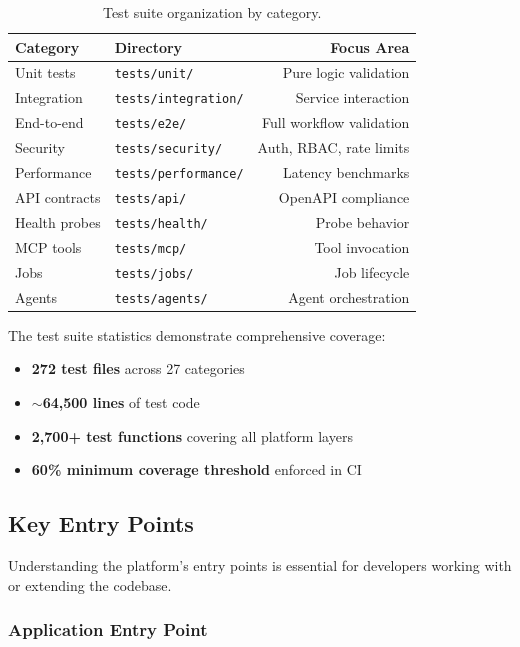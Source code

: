 \begin{table}[ht]
\centering
\caption{Test suite organization by category.}
\label{tab:test-categories}
\small
\begin{tabular}{llr}
\hline
\textbf{Category} & \textbf{Directory} & \textbf{Focus Area} \\
\hline
Unit tests & \texttt{tests/unit/} & Pure logic validation \\
Integration & \texttt{tests/integration/} & Service interaction \\
End-to-end & \texttt{tests/e2e/} & Full workflow validation \\
Security & \texttt{tests/security/} & Auth, RBAC, rate limits \\
Performance & \texttt{tests/performance/} & Latency benchmarks \\
API contracts & \texttt{tests/api/} & OpenAPI compliance \\
Health probes & \texttt{tests/health/} & Probe behavior \\
MCP tools & \texttt{tests/mcp/} & Tool invocation \\
Jobs & \texttt{tests/jobs/} & Job lifecycle \\
Agents & \texttt{tests/agents/} & Agent orchestration \\
\hline
\end{tabular}
\end{table}

The test suite statistics demonstrate comprehensive coverage:

\begin{itemize}
    \item \textbf{272 test files} across 27 categories
    \item \textbf{$\sim$64,500 lines} of test code
    \item \textbf{2,700+ test functions} covering all platform layers
    \item \textbf{60\% minimum coverage threshold} enforced in CI
\end{itemize}

\subsection{Key Entry Points}
\label{subsec:key-entry-points}

Understanding the platform's entry points is essential for developers working with or extending the codebase.

\subsubsection{Application Entry Point}

